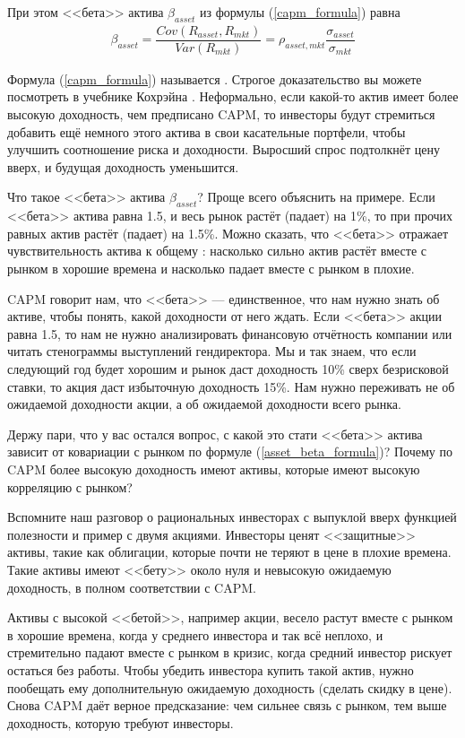 При этом <<бета>> актива $\beta_{asset}$ из формулы (\ref{capm_formula}) равна
\begin{align}
\beta_{asset} = \dfrac{Cov(R_{asset}, R_{mkt})}{Var(R_{mkt})} = \rho_{asset,mkt}\dfrac{\sigma_{asset}}{\sigma_{mkt}}
\label{asset_beta_formula}
\end{align}

Формула (\ref{capm_formula}) называется . Строгое доказательство вы можете посмотреть в учебнике Кохрэйна \cite[p.~152]{cochrane2005asset}. Неформально, если какой-то актив имеет более высокую доходность, чем предписано CAPM, то инвесторы будут стремиться добавить ещё немного этого актива в свои касательные портфели, чтобы улучшить соотношение риска и доходности. Выросший спрос подтолкнёт цену вверх, и будущая доходность уменьшится.

Что такое <<бета>> актива $\beta_{asset}$? Проще всего объяснить на примере. Если <<бета>> актива равна 1.5, и весь рынок растёт (падает) на 1\%, то при прочих равных актив растёт (падает) на 1.5\%. Можно сказать, что <<бета>> отражает чувствительность актива к общему : насколько сильно актив растёт вместе с рынком в хорошие времена и насколько падает вместе с рынком в плохие.

CAPM говорит нам, что <<бета>> --- единственное, что нам нужно знать об активе, чтобы понять, какой доходности от него ждать. Если <<бета>> акции равна 1.5, то нам не нужно анализировать финансовую отчётность компании или читать стенограммы выступлений гендиректора. Мы и так знаем, что если следующий год будет хорошим и рынок даст доходность 10\% сверх безрисковой ставки, то акция даст избыточную доходность 15\%. Нам нужно переживать не об ожидаемой доходности акции, а об ожидаемой доходности всего рынка.

Держу пари, что у вас остался вопрос, с какой это стати <<бета>> актива зависит от ковариации с рынком по формуле (\ref{asset_beta_formula})? Почему по CAPM более высокую доходность имеют активы, которые имеют высокую корреляцию с рынком?

Вспомните наш разговор о рациональных инвесторах с выпуклой вверх функцией полезности и пример с двумя акциями. Инвесторы ценят <<защитные>> активы, такие как облигации, которые почти не теряют в цене в плохие времена. Такие активы имеют <<бету>> около нуля и невысокую ожидаемую доходность, в полном соответствии с CAPM.

Активы с высокой <<бетой>>, например акции, весело растут вместе с рынком в хорошие времена, когда у среднего инвестора и так всё неплохо, и стремительно падают вместе с рынком в кризис, когда средний инвестор рискует остаться без работы. Чтобы убедить инвестора купить такой актив, нужно пообещать ему дополнительную ожидаемую доходность (сделать скидку в цене). Снова CAPM даёт верное предсказание: чем сильнее связь с рынком, тем выше доходность, которую требуют инвесторы.

